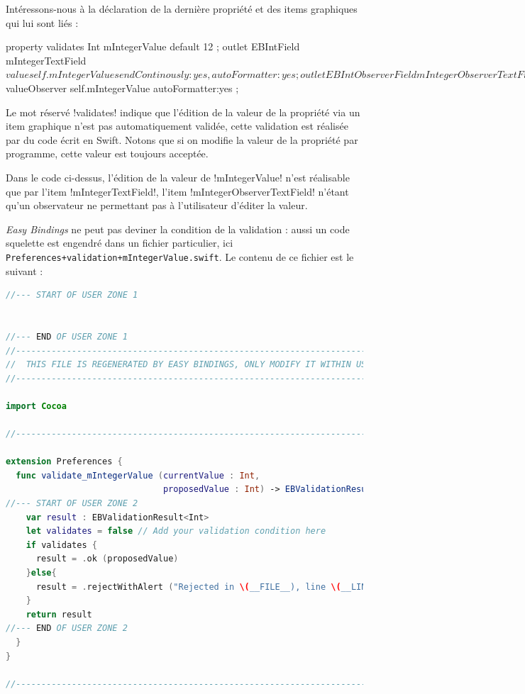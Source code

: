 
Intéressons-nous à la déclaration de la dernière propriété et des items graphiques qui lui sont liés :

\begin{ebcode}
property validates Int mIntegerValue default 12 ;
outlet EBIntField mIntegerTextField
  $value self.mIntegerValue {sendContinously : yes, autoFormatter:yes}
;
outlet EBIntObserverField mIntegerObserverTextField
  $valueObserver self.mIntegerValue {autoFormatter:yes}
;
\end{ebcode}

Le mot réservé \eb!validates! indique que l'édition de la valeur de la propriété via un item graphique n'est pas automatiquement validée, cette validation est réalisée par du code écrit en Swift. Notons que si on modifie la valeur de la propriété par programme, cette valeur est toujours acceptée.

Dans le code ci-dessus, l'édition de la valeur de \eb!mIntegerValue! n'est réalisable que par l'item \eb!mIntegerTextField!, l'item \eb!mIntegerObserverTextField! n'étant qu'un observateur ne permettant pas à l'utilisateur d'éditer la valeur.

\emph{Easy Bindings} ne peut pas deviner la condition de la validation : aussi un code squelette est engendré dans un fichier particulier, ici \texttt{Preferences+validation+mIntegerValue.swift}. Le contenu de ce fichier est le suivant :

\begin{lstlisting}[language=swift]
//--- START OF USER ZONE 1


//--- END OF USER ZONE 1
//------------------------------------------------------------------------------
//  THIS FILE IS REGENERATED BY EASY BINDINGS, ONLY MODIFY IT WITHIN USER ZONES
//------------------------------------------------------------------------------

import Cocoa

//------------------------------------------------------------------------------*

extension Preferences {
  func validate_mIntegerValue (currentValue : Int,
                               proposedValue : Int) -> EBValidationResult <Int> {
//--- START OF USER ZONE 2
    var result : EBValidationResult<Int>
    let validates = false // Add your validation condition here
    if validates {
      result = .ok (proposedValue)
    }else{
      result = .rejectWithAlert ("Rejected in \(__FILE__), line \(__LINE__)")
    }
    return result
//--- END OF USER ZONE 2
  }
}

//--------------------------------------------------------------------------------*
\end{lstlisting}

